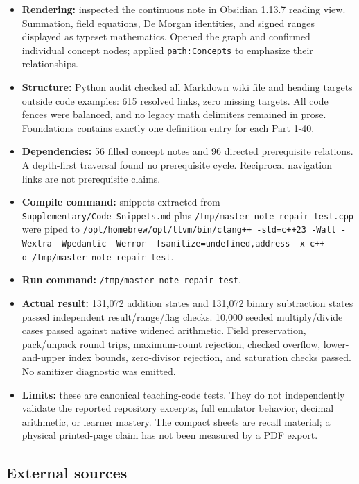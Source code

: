 \begin{itemize}
\tightlist
\item
  \textbf{Rendering:} inspected the continuous note in Obsidian 1.13.7 reading view. Summation, field equations, De Morgan identities, and signed ranges displayed as typeset mathematics. Opened the graph and confirmed individual concept nodes; applied \texttt{path:Concepts} to emphasize their relationships.
\item
  \textbf{Structure:} Python audit checked all Markdown wiki file and heading targets outside code examples: 615 resolved links, zero missing targets. All code fences were balanced, and no legacy math delimiters remained in prose. Foundations contains exactly one definition entry for each Part 1-40.
\item
  \textbf{Dependencies:} 56 filled concept notes and 96 directed prerequisite relations. A depth-first traversal found no prerequisite cycle. Reciprocal navigation links are not prerequisite claims.
\item
  \textbf{Compile command:} snippets extracted from \texttt{Supplementary/Code\ Snippets.md} plus \texttt{/tmp/master-note-repair-test.cpp} were piped to \texttt{/opt/homebrew/opt/llvm/bin/clang++\ -std=c++23\ -Wall\ -Wextra\ -Wpedantic\ -Werror\ -fsanitize=undefined,address\ -x\ c++\ -\ -o\ /tmp/master-note-repair-test}.
\item
  \textbf{Run command:} \texttt{/tmp/master-note-repair-test}.
\item
  \textbf{Actual result:} 131,072 addition states and 131,072 binary subtraction states passed independent result/range/flag checks. 10,000 seeded multiply/divide cases passed against native widened arithmetic. Field preservation, pack/unpack round trips, maximum-count rejection, checked overflow, lower-and-upper index bounds, zero-divisor rejection, and saturation checks passed. No sanitizer diagnostic was emitted.
\item
  \textbf{Limits:} these are canonical teaching-code tests. They do not independently validate the reported repository excerpts, full emulator behavior, decimal arithmetic, or learner mastery. The compact sheets are recall material; a physical printed-page claim has not been measured by a PDF export.
\end{itemize}

\subsection{External sources}\label{appendix-a103e7846d21-external-sources}

